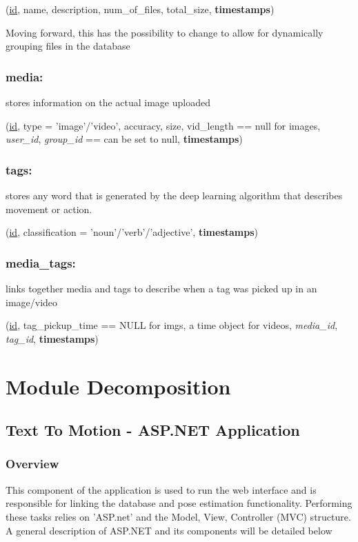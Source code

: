 \documentclass{scrreprt}
\begin{document}
(\underline{id}, name, description, num\_of\_files, total\_size, \textbf{timestamps})

Moving forward, this has the possibility to change to allow for dynamically
grouping files in the database


\subsection{media:}

stores information on the actual image uploaded

(\underline{id}, type = 'image'/'video', accuracy, size, vid\_length == null
for images, \textit{user\_id}, \textit{group\_id} == can be set to null,
\textbf{timestamps})


\subsection{tags:}

stores any word that is generated by the deep learning algorithm that describes
movement or action.

(\underline{id}, classification = 'noun'/'verb'/'adjective',
\textbf{timestamps})


\subsection{media\_tags:}

links together media and tags to describe when a tag was picked up in an image/video

(\underline{id}, tag\_pickup\_time == NULL for imgs, a time object for videos,
\textit{media\_id}, \textit{tag\_id}, \textbf{timestamps})

\chapter{Module Decomposition}

\section{Text To Motion - ASP.NET Application}

\subsection{Overview}

This component of the application is used to run the web interface and is
responsible for linking the database and pose estimation functionality.
Performing these tasks relies on 'ASP.net' and the Model, View, Controller
(MVC) structure. A general description of ASP.NET and its components will be
detailed below
\end{document}
